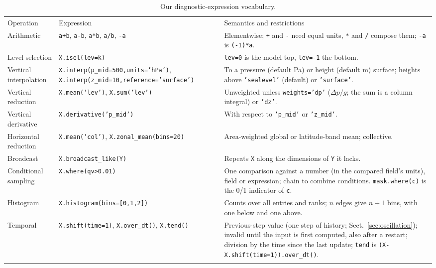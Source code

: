 \documentclass[gmd, manuscript]{copernicus}
\newcommand{\bk}{\discretionary{}{}{}}
\begin{document}
\begin{table}[t]
\caption{Our diagnostic-expression vocabulary.}
\label{tab:vocabulary}
\footnotesize \setlength{\tabcolsep}{4pt}\linespread{1.05}\selectfont
\begin{tabularx}{\textwidth}{%
  >{\raggedright\arraybackslash}p{2.2cm}
  >{\raggedright\arraybackslash}p{5.0cm}
  >{\raggedright\arraybackslash}X}
\tophline
Operation & Expression & Semantics and restrictions \\
\middlehline
Arithmetic & \texttt{a+b}, \texttt{a-b}, \texttt{a*b}, \texttt{a/b}, \texttt{-a} & Elementwise; \texttt{+} and \texttt{-} need equal units, \texttt{*} and \texttt{/} compose them; \texttt{-a} is \texttt{(-1)*a}. \\
Level selection & \texttt{X.isel(lev=k)} & \texttt{lev=0} is the model top, \texttt{lev=-1} the bottom. \\
Vertical interpolation & \texttt{X.interp(p\_mid=500,\bk units='hPa')}, \texttt{X.interp(z\_mid=10,\bk reference='surface')} & To a pressure (default Pa) or height (default m) surface; heights above \texttt{'sealevel'} (default) or \texttt{'surface'}. \\
Vertical reduction & \texttt{X.mean('lev')}, \texttt{X.sum('lev')} & Unweighted unless \texttt{weights='dp'} ($\Delta p/g$; the sum is a column integral) or \texttt{'dz'}. \\
Vertical derivative & \texttt{X.derivative('p\_mid')} & With respect to \texttt{'p\_mid'} or \texttt{'z\_mid'}. \\
Horizontal reduction & \texttt{X.mean('col')}, \texttt{X.zonal\_mean(bins=20)} & Area-weighted global or latitude-band mean; collective. \\
Broadcast & \texttt{X.broadcast\_like(Y)} & Repeats \texttt{X} along the dimensions of \texttt{Y} it lacks. \\
Conditional sampling & \texttt{X.where(qv>0.01)} & One comparison against a number (in the compared field's units), field or expression; chain to combine conditions. \texttt{mask.where(c)} is the 0/1 indicator of \texttt{c}. \\
Histogram & \texttt{X.histogram(\bk bins=[0,1,2])} & Counts over all entries and ranks; $n$ edges give $n+1$ bins, with one below and one above. \\
Temporal & \texttt{X.shift(time=1)}, \texttt{X.over\_dt()}, \texttt{X.tend()} & Previous-step value (one step of history; Sect.~\ref{sec:oscillation}); invalid until the input is first computed, also after a restart; division by the time since the last update; \texttt{tend} is \texttt{(X-X.shift(time=1)).over\_dt()}. \\
\bottomhline
\end{tabularx}
\normalsize
\end{table}
\end{document}
